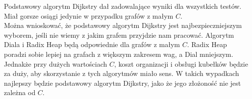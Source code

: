 \documentclass{article}
\begin{document}
Podstawowy algorytm Dijkstry dał zadowalające wyniki dla wszystkich testów.
Miał gorsze osiągi jedynie w przypadku grafów z małym $C$. \\

\noindent Można wnioskować, że podstawowy algorytm Dijkstry jest najbezpieczniejszym wyborem, jeśli nie wiemy z jakim grafem przyjdzie nam pracować.
Algorytm Diala i Radix Heap będą odpowiednie dla grafów z małym $C$. Radix Heap poradzi sobie lepiej na grafach z większym zakresem wag, a Dial mniejszym.
Jednakże przy dużych wartościach $C$, koszt organizacji i obsługi kubełków będzie za duży, aby skorzystanie z tych algorytmów miało sens.
W takich wypadkach najlepszy będzie podstawowy algorytm Dijkstry, jako że jego złożoność nie jest zależna od $C$.
\end{document}

